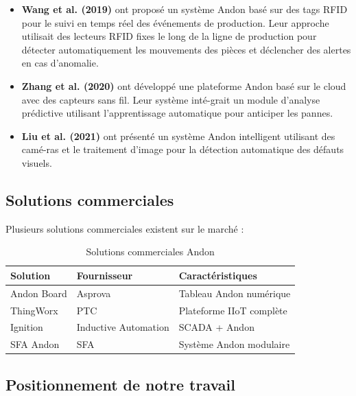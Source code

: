\begin{itemize}
    \item \textbf{Wang et al. (2019)} ont propos\'e un syst\`eme Andon bas\'e sur des tags RFID pour le suivi en temps r\'eel des \'ev\'enements de production. Leur approche utilisait des lecteurs RFID fixes le long de la ligne de production pour d\'etecter automatiquement les mouvements des pi\`eces et d\'eclencher des alertes en cas d'anomalie.
    
    \item \textbf{Zhang et al. (2020)} ont d\'evelopp\'e une plateforme Andon bas\'e sur le cloud avec des capteurs sans fil. Leur syst\`eme int\'e-grait un module d'analyse pr\'edictive utilisant l'apprentissage automatique pour anticiper les pannes.
    
    \item \textbf{Liu et al. (2021)} ont pr\'esent\'e un syst\`eme Andon intelligent utilisant des cam\'e-ras et le traitement d'image pour la d\'etection automatique des d\'efauts visuels.
\end{itemize}

\subsection{Solutions commerciales}

Plusieurs solutions commerciales existent sur le march\'e :

\begin{table}[htbp]
\centering
\renewcommand{\arraystretch}{1.3}
\begin{tabular}{l l l}
\toprule
\textbf{Solution} & \textbf{Fournisseur} & \textbf{Caract\'eristiques} \\
\midrule
Andon Board & Asprova & Tableau Andon num\'erique \\
ThingWorx & PTC & Plateforme IIoT compl\`ete \\
Ignition & Inductive Automation & SCADA + Andon \\
SFA Andon & SFA & Syst\`eme Andon modulaire \\
\bottomrule
\end{tabular}
\caption{Solutions commerciales Andon}
\label{tab:solutions_commerciales}
\end{table}

\subsection{Positionnement de notre travail}

